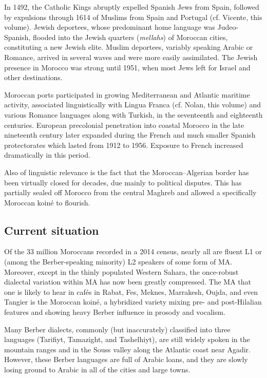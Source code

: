 \documentclass[output=paper]{langsci/langscibook}
\begin{document}
In 1492, the Catholic Kings abruptly expelled Spanish Jews from Spain, followed by expulsions through 1614 of Muslims from Spain and Portugal (cf. Vicente, this volume). Jewish deportees, whose predominant home language was Judeo-Spanish, flooded into the Jewish quarters (\textit{mellahs}) of Moroccan cities, constituting a new Jewish elite. Muslim deportees, variably speaking Arabic or Romance, arrived in several waves and were more easily assimilated. The Jewish presence in Morocco was strong until 1951, when most Jews left for Israel and other destinations.

Moroccan ports participated in growing Mediterranean and Atlantic maritime activity, associated linguistically with Lingua Franca (cf. Nolan, this volume) and various Romance languages along with Turkish, in the seventeenth and eighteenth centuries. European precolonial penetration into coastal Morocco in the late nineteenth century later expanded during the French and much smaller Spanish protectorates which lasted from 1912 to 1956. Exposure to French increased dramatically in this period. 

Also of linguistic relevance is the fact that the Moroccan–Algerian border has been virtually closed for decades, due mainly to political disputes. This has partially sealed off Morocco from the central Maghreb and allowed a specifically Moroccan koiné to flourish.

\subsection{Current situation}

Of the 33 million Moroccans recorded in a 2014 census, nearly all are fluent L1 or (among the Berber-speaking minority) L2 speakers of some form of MA. Moreover, except in the thinly populated Western Sahara, the once-robust dialectal variation within MA has now been greatly compressed. The MA that one is likely to hear in cafés in Rabat, Fes, Meknes, Marrakesh, Oujda, and even Tangier is the Moroccan koiné, a hybridized variety mixing pre- and post-Hilalian features and showing heavy Berber influence in prosody and vocalism.

Many Berber dialects, commonly (but inaccurately) classified into three languages (Tarifiyt, Tamazight, and Tashelhiyt), are still widely spoken in the mountain ranges and in the Souss valley along the Atlantic coast near Agadir. However, these Berber languages are full of Arabic loans, and they are slowly losing ground to Arabic in all of the cities and large towns.
\end{document}
